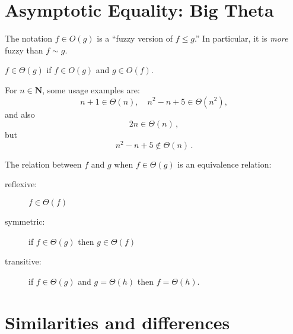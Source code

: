 \documentclass{tstextbook}
\begin{document}
\section{Asymptotic Equality: Big Theta}

The notation \(f\in O(g) \) is a “fuzzy version of \(f\leq g\).”
In particular, it is \emph{more} fuzzy than $f\sim g$.

\begin{definition}
  $f\in \Theta(g)$ if $f\in O(g)$ and $g\in O(f)$.
\end{definition}

\begin{example}
  For $n\in \mathbf N$, some usage examples are:
\[ n + 1 \in \Theta(n), \quad n^2 - n + 5 \in \Theta( n^2), \] 
and also
\[ 2n \in \Theta ( n)\,,\]
but  
\[ n^2 - n + 5 \notin  \Theta(n)\,. \] 
\end{example}

\begin{theorem}[as a relation]
  \label{thm: Oh as a relation}
The relation between \(f\) and \(g\) when \(f\in \Theta(g)\) is an equivalence relation:
  \begin{description}
    \item[reflexive:] \( f \in \Theta(f)\)
    \item[symmetric:] if \( f \in \Theta(g)\) then \(g \in \Theta(f)\)
    \item[transitive:] if \( f\in \Theta ( g)\)  and   \(g= \Theta(h)\) then \(f= \Theta( h)\).
  \end{description}
\end{theorem}

\section{Similarities and differences}

%
%
%
\end{document}
